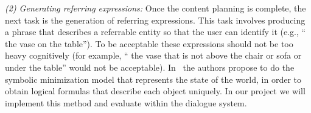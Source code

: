 
\emph{(2) Generating referring expressions:} Once the content planning is
complete, the next task is the generation of referring expressions. This task
involves
producing a phrase that describes a referrable entity so that the user can
identify it (e.g., `` the vase on the table''). To be
acceptable these expressions should not be too heavy cognitively (for
example, `` the vase that is not above the chair or sofa or under the
table'' would not be acceptable). In~\cite{AKS08} the authors propose to
do the symbolic minimization model that represents the state of the world, in
order to obtain logical formulas that describe each object uniquely. In our
project we
will implement this method and evaluate within the dialogue system.
% 

